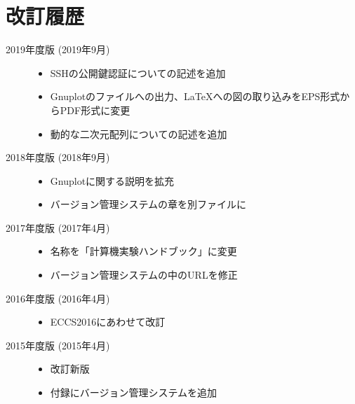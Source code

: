 \section*{改訂履歴}

\noindent
\begin{description}
\item[2019年度版 (2019年9月)] \mbox{}
  
  \begin{itemize}
  \item SSHの公開鍵認証についての記述を追加
  \item Gnuplotのファイルへの出力、\LaTeX への図の取り込みをEPS形式からPDF形式に変更
  \item 動的な二次元配列についての記述を追加
  \end{itemize}

\item[2018年度版 (2018年9月)] \mbox{}
  
  \begin{itemize}
  \item Gnuplotに関する説明を拡充
  \item バージョン管理システムの章を別ファイルに
  \end{itemize}

\item[2017年度版 (2017年4月)] \mbox{}
  
  \begin{itemize}
  \item 名称を「計算機実験ハンドブック」に変更
  \item バージョン管理システムの中のURLを修正
  \end{itemize}

\item[2016年度版 (2016年4月)] \mbox{}

  \begin{itemize}
  \item ECCS2016にあわせて改訂
  \end{itemize}

\item[2015年度版 (2015年4月)] \mbox{}

  \begin{itemize}
  \item 改訂新版
  \item 付録にバージョン管理システムを追加
  \end{itemize}

\end{description}
